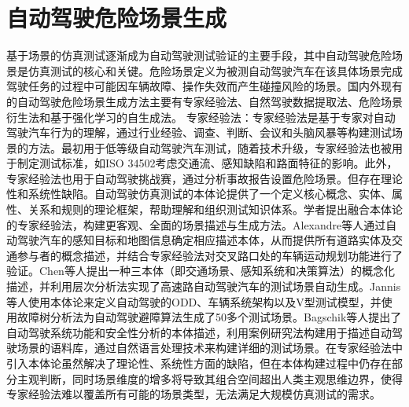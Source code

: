 \section{自动驾驶危险场景生成}
基于场景的仿真测试逐渐成为自动驾驶测试验证的主要手段，其中自动驾驶危险场景是仿真测试的核心和关键。危险场景定义为被测自动驾驶汽车在该具体场景完成驾驶任务的过程中可能因车辆故障、操作失效而产生碰撞风险的场景。国内外现有的自动驾驶危险场景生成方法主要有专家经验法、自然驾驶数据提取法、危险场景衍生法和基于强化学习的自生成法。
专家经验法：专家经验法是基于专家对自动驾驶汽车行为的理解，通过行业经验、调查、判断、会议和头脑风暴等构建测试场景的方法。最初用于低等级自动驾驶汽车测试，随着技术升级，专家经验法也被用于制定测试标准，如ISO 34502考虑交通流、感知缺陷和路面特征的影响。此外，专家经验法也用于自动驾驶挑战赛，通过分析事故报告设置危险场景。但存在理论性和系统性缺陷。自动驾驶仿真测试的本体论提供了一个定义核心概念、实体、属性、关系和规则的理论框架，帮助理解和组织测试知识体系。学者提出融合本体论的专家经验法，构建更客观、全面的场景描述与生成方法。Alexandre等人通过自动驾驶汽车的感知目标和地图信息确定相应描述本体，从而提供所有道路实体及交通参与者的概念描述，并结合专家经验法对交叉路口处的车辆运动规划功能进行了验证。Chen等人提出一种三本体（即交通场景、感知系统和决策算法）的概念化描述，并利用层次分析法实现了高速路自动驾驶汽车的测试场景自动生成。Jannis等人使用本体论来定义自动驾驶的ODD、车辆系统架构以及V型测试模型，并使用故障树分析法为自动驾驶避障算法生成了50多个测试场景。Bagschik等人提出了自动驾驶系统功能和安全性分析的本体描述，利用案例研究法构建用于描述自动驾驶场景的语料库，通过自然语言处理技术来构建详细的测试场景。在专家经验法中引入本体论虽然解决了理论性、系统性方面的缺陷，但在本体构建过程中仍存在部分主观判断，同时场景维度的增多将导致其组合空间超出人类主观思维边界，使得专家经验法难以覆盖所有可能的场景类型，无法满足大规模仿真测试的需求。
